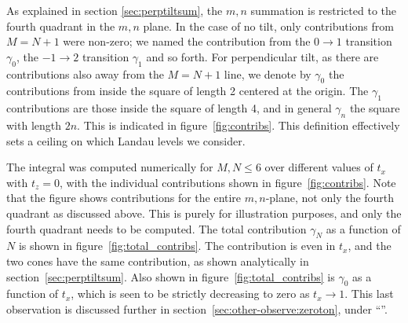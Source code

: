 As explained in section \ref{sec:perptiltsum}, the \( m,n \) summation is restricted to the fourth quadrant in the \( m,n \) plane.
In the case of no tilt, only contributions from \( M = N + 1 \) were non-zero;
we named the contribution from the \( 0\to 1 \) transition \( \gamma_0 \), the \( -1\to 2 \) transition \( \gamma_1 \) and so forth.
For perpendicular tilt, as there are contributions also away from the \( M=N + 1 \) line, we denote by \( \gamma_0 \) the contributions from inside the square of length 2 centered at the origin.
The \( \gamma_1 \) contributions are those inside the square of length 4, and in general \( \gamma_n \) the square with length \( 2 n \).
This is indicated in figure~\ref{fig:contribs}.
This definition effectively sets a ceiling on which Landau levels we consider.

The integral was computed numerically for \( M,N \leq 6 \) over different values of \( t_x \) with \( t_z = 0 \), with the individual contributions shown in figure~\ref{fig:contribs}.
Note that the figure shows contributions for the entire \( m,n \)-plane, not only the fourth quadrant as discussed above.
This is purely for illustration purposes, and only the fourth quadrant needs to be computed.
The total contribution \( \gamma_N \) as a function of \( N \) is shown in figure~\ref{fig:total_contribs}.
The contribution is even in \( t_x \), and the two cones have the same contribution, as shown analytically in section~\ref{sec:perptiltsum}.
Also shown in figure~\ref{fig:total_contribs} is \( \gamma_0 \) as a function of \( t_x \), which is seen to be strictly decreasing to zero as \( t_x \to 1 \).
This last observation is discussed further in section~\ref{sec:other-observe:zeroton}, under
``''.

